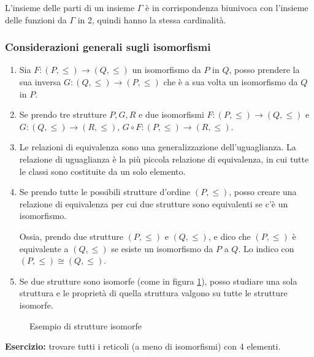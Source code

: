L'insieme delle parti di un insieme $\Gamma$ \`e in corrispondenza biunivoca con l'insieme delle funzioni da $\Gamma$ in 2, quindi hanno la stessa cardinalit\`a.

\subsubsection{Considerazioni generali sugli isomorfismi}

\begin{enumerate}
  \item Sia $F : (P, \le) \to (Q, \le)$ un isomorfismo da $P$ in $Q$, posso prendere la sua inversa $G : (Q, \le) \to (P, \le)$ che \`e a sua volta un isomorfismo da $Q$ in $P$.
  \item Se prendo tre strutture $P, G, R$ e due isomorfismi $F : (P, \le) \to (Q, \le)$ e $G : (Q, \le) \to (R, \le)$, $G \circ F : (P, \le) \to (R, \le)$.
  \item Le relazioni di equivalenza sono una generalizzazione dell'uguaglianza. La relazione di uguaglianza \`e la pi\`u piccola relazione di equivalenza, in cui tutte le classi sono costituite da un solo elemento.
  \item Se prendo tutte le possibili strutture d'ordine $(P, \le)$, posso creare una relazione di equivalenza per cui due strutture sono equivalenti se c'\`e un isomorfismo.

  Ossia, prendo due strutture $(P, \le)$ e $(Q, \le)$, e dico che $(P, \le)$ \`e equivalente a $(Q, \le)$ se esiste un isomorfismo da $P$ a $Q$. Lo indico con $(P, \le) \cong (Q, \le)$.
  \item Se due strutture sono isomorfe (come in figura \ref{fig:strutture_isomorfe}), posso studiare una sola struttura e le propriet\`a di quella struttura valgono su tutte le strutture isomorfe.
\end{enumerate}

\begin{figure}
\centering
{}
\caption{\label{fig:strutture_isomorfe}Esempio di strutture isomorfe}
\end{figure}

\textbf{Esercizio:} trovare tutti i reticoli (a meno di isomorfismi) con 4 elementi.

\vspace{5cm}






